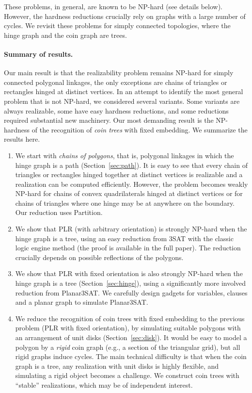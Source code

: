 \documentclass{article}
\theoremstyle{plain}%
\begin{document}
These problems, in general, are known to be NP-hard (see details below). However, the hardness reductions crucially rely on graphs with a large number of cycles. We revisit these problems for simply connected topologies, where the hinge graph and the coin graph are trees.

\paragraph{Summary of results.}
Our main result is that the realizability problem remains NP-hard for simply connected polygonal linkages, the only exceptions are chains of triangles or rectangles hinged at distinct vertices. In an attempt to identify the most general problem that is not NP-hard, we considered several variants. Some variants are always realizable, some have easy hardness reductions, and some reductions required substantial new machinery. Our most demanding result is the NP-hardness of the recognition of \emph{coin trees} with fixed embedding. We summarize the results here.

\begin{enumerate}
\item We start with \emph{chains of polygons}, that is, polygonal linkages in which the hinge graph is a path (Section~\ref{sec:path}). It is easy to see that every chain of triangles or rectangles hinged together at distinct vertices is realizable and a realization can be computed efficiently. However, the problem becomes weakly NP-hard for chains of convex quadrilaterals hinged at distinct vertices or for  chains of triangles where one hinge may be at anywhere on the boundary. Our reduction uses {\sc Partition}.
\item We show that {\sc PLR} (with arbitrary orientation) is strongly NP-hard when the hinge graph is a tree, using an easy reduction from {\sc 3SAT} with the classic logic engine method (the proof is available in the full paper). The reduction crucially depends on possible reflections of the polygons.
\item We show that {\sc PLR} with fixed orientation is also strongly NP-hard when the hinge graph is a tree (Section~\ref{sec:hinge}), using a significantly more involved reduction from {\sc Planar3SAT}. We carefully design gadgets for variables, clauses and a planar graph to simulate {\sc Planar3SAT}.
\item We reduce the recognition of coin trees with fixed embedding to the previous problem ({\sc PLR} with fixed orientation), by simulating suitable polygons with an arrangement of unit disks (Section~\ref{sec:disk}). It would be easy to model a polygon by a \emph{rigid} coin graph (e.g., a section of the triangular grid), but all rigid graphs induce cycles. The main technical difficulty is that when the coin graph is a tree, any realization with unit disks is highly flexible, and simulating a rigid object becomes a challenge. We construct coin trees with ``stable'' realizations, which may be of independent interest.
\end{enumerate}
\end{document}

